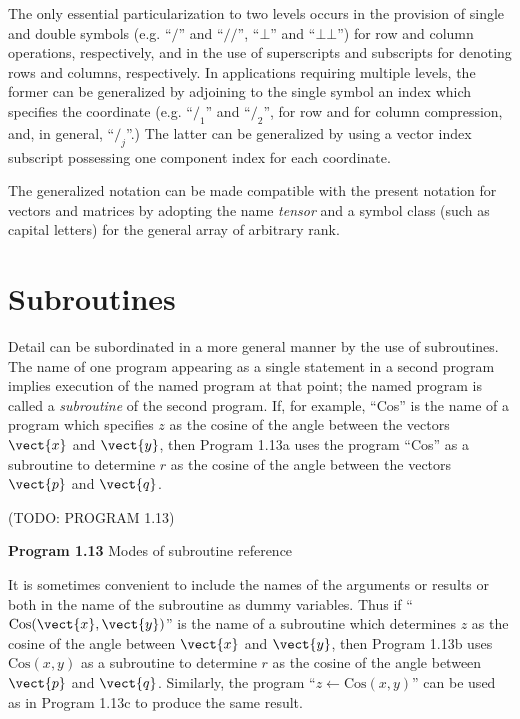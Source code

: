 \par The only essential particularization to two levels occurs in the provision of single and double symbols (e.g. ``$/$'' and ``$/\!/$'', ``$⊥$'' and ``$⊥⊥$'') for row and column operations, respectively, and in the use of superscripts and subscripts for denoting rows and columns, respectively. In applications requiring multiple levels, the former can be generalized by adjoining to the single symbol an index which specifies the coordinate (e.g. ``$/_1$'' and ``$/_2$'', for row and for column compression, and, in general, ``$/_j$''.) The latter can be generalized by using a vector index subscript possessing one component index for each coordinate.

\par The generalized notation can be made compatible with the present notation for vectors and matrices by adopting the name \textit{tensor} and a symbol class (such as capital letters) for the general array of arbitrary rank.

\section{Subroutines}

\par Detail can be subordinated in a more general manner by the use of subroutines. The name of one program appearing as a single statement in a second program implies execution of the named program at that point; the named program is called a \textit{subroutine} of the second program. If, for example, ``Cos'' is the name of a program which specifies $z$ as the cosine of the angle between the vectors $\vect{x}$ and $\vect{y}$, then Program 1.13a uses the program ``Cos'' as a subroutine to determine $r$ as the cosine of the angle between the vectors $\vect{p}$ and $\vect{q}$.

\par (TODO: PROGRAM 1.13)

\par \textbf{Program 1.13} Modes of subroutine reference

\par It is sometimes convenient to include the names of the arguments or results or both in the name of the subroutine as dummy variables. Thus if ``$\text{Cos}(\vect{x}, \vect{y})$'' is the name of a subroutine which determines $z$ as the cosine of the angle between $\vect{x}$ and $\vect{y}$, then Program 1.13b uses $\text{Cos}(x, y)$ as a subroutine to determine $r$ as the cosine of the angle between $\vect{p}$ and $\vect{q}$. Similarly, the program ``$z ← \text{Cos}(x, y)$'' can be used as in Program 1.13c to produce the same result.

